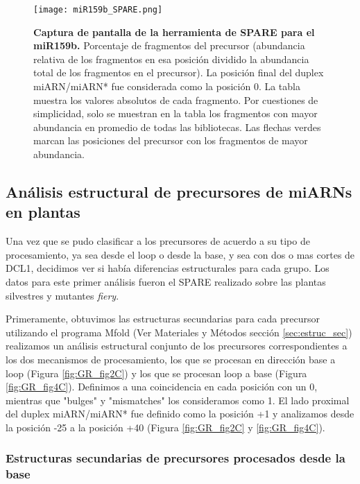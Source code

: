 \begin{landscape}
    \begin{figure}[htbp!] 
        \centering    
        \texttt{[image: miR159b\_SPARE.png]}
		\caption[Captura de pantalla de la herramienta de SPARE para el miR159b]{
        \textbf{Captura de pantalla de la herramienta de SPARE para el miR159b.}
        Porcentaje de fragmentos del precursor (abundancia relativa de los fragmentos en esa posición dividido la abundancia total de los fragmentos en el precursor).
        La posición final del duplex miARN/miARN* fue considerada como la posición 0.
        La tabla muestra los valores absolutos de cada fragmento.
        Por cuestiones de simplicidad, solo se muestran en la tabla los fragmentos con mayor abundancia en promedio de todas las bibliotecas.
        Las flechas verdes marcan las posiciones del precursor con los fragmentos de mayor abundancia.
        }
		\label{fig:miR159b_SPARE}
    \end{figure}
\end{landscape}


\subsection{Análisis estructural de precursores de miARNs en plantas}

Una vez que se pudo clasificar a los precursores de acuerdo a su tipo de procesamiento, ya sea desde el loop o desde la base, y sea con dos o mas cortes de DCL1, decidimos ver si había diferencias estructurales para cada grupo.
Los datos para este primer análisis fueron el SPARE realizado sobre las plantas silvestres y mutantes \textit{fiery}.

Primeramente, obtuvimos las estructuras secundarias para cada precursor  utilizando el programa Mfold\citep{pmid12824337} (Ver Materiales y Métodos sección \ref{sec:estruc_sec}) realizamos un análisis estructural conjunto de los precursores correspondientes a los dos mecanismos de procesamiento, los que se procesan en dirección base a loop (Figura \ref{fig:GR_fig2C}) y los que se procesan loop a base (Figura \ref{fig:GR_fig4C}).
Definimos a una coincidencia en cada posición con un 0, mientras que "bulges" y "mismatches" los consideramos como 1.
El lado proximal del duplex miARN/miARN* fue definido como la posición +1 y analizamos desde la posición -25 a la posición +40 (Figura \ref{fig:GR_fig2C} y \ref{fig:GR_fig4C}). 

\subsubsection{Estructuras secundarias de precursores procesados desde la base}

